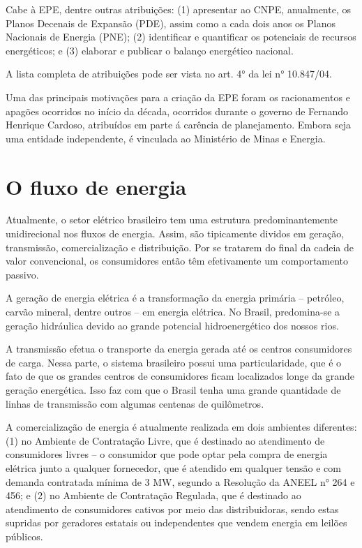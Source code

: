 \documentclass[grad,numbers]{coppe}
\begin{document}
  Cabe à EPE, dentre outras atribuições: (1) apresentar ao CNPE, anualmente, os Planos Decenais de Expansão (PDE), assim como a cada dois anos os Planos Nacionais de Energia (PNE); (2) identificar e quantificar os potenciais de recursos energéticos; e (3) elaborar e publicar o balanço energético nacional.

  A lista completa de atribuições pode ser vista no art. 4° da lei n° 10.847/04.

  Uma das principais motivações para a criação da EPE foram os racionamentos e apagões ocorridos no início da década, ocorridos durante o governo de Fernando Henrique Cardoso, atribuídos em parte á carência de planejamento. Embora seja uma entidade independente, é vinculada ao Ministério de Minas e Energia.

  \hypertarget{o-fluxo-de-energia}{%
  \section{O fluxo de energia}\label{o-fluxo-de-energia}}

  Atualmente, o setor elétrico brasileiro tem uma estrutura predominantemente unidirecional nos fluxos de energia. Assim, são tipicamente dividos em geração, transmissão, comercialização e distribuição. Por se tratarem do final da cadeia de valor convencional, os consumidores então têm efetivamente um comportamento passivo.

  A geração de energia elétrica é a transformação da energia primária -- petróleo, carvão mineral, dentre outros -- em energia elétrica. No Brasil, predomina-se a geração hidráulica devido ao grande potencial hidroenergético dos nossos rios.

  A transmissão efetua o transporte da energia gerada até os centros consumidores de carga. Nessa parte, o sistema brasileiro possui uma particularidade, que é o fato de que os grandes centros de consumidores ficam localizados longe da grande geração energética. Isso faz com que o Brasil tenha uma grande quantidade de linhas de transmissão com algumas centenas de quilômetros.

  A comercialização de energia é atualmente realizada em dois ambientes diferentes: (1) no Ambiente de Contratação Livre, que é destinado ao atendimento de consumidores livres -- o consumidor que pode optar pela compra de energia elétrica junto a qualquer fornecedor, que é atendido em qualquer tensão e com demanda contratada mínima de 3 MW, segundo a Resolução da ANEEL n° 264 e 456; e (2) no Ambiente de Contratação Regulada, que é destinado ao atendimento de consumidores cativos por meio das distribuidoras, sendo estas supridas por geradores estatais ou independentes que vendem energia em leilões públicos.
\end{document}
